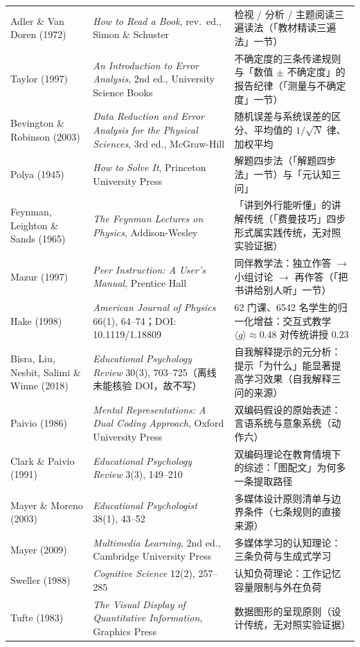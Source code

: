 {\begin{longtable}{@{}p{4.4cm}p{5.2cm}p{5.2cm}@{}}
Adler \& Van Doren (1972) & \textit{How to Read a Book}, rev.\ ed., Simon \& Schuster & 检视 / 分析 / 主题阅读三遍读法（「教材精读三遍法」一节） \\
Taylor (1997) & \textit{An Introduction to Error Analysis}, 2nd ed., University Science Books & 不确定度的三条传递规则与「数值 $\pm$ 不确定度」的报告纪律（「测量与不确定度」一节） \\
Bevington \& Robinson (2003) & \textit{Data Reduction and Error Analysis for the Physical Sciences}, 3rd ed., McGraw-Hill & 随机误差与系统误差的区分、平均值的 $1/\sqrt{N}$ 律、加权平均 \\
Polya (1945) & \textit{How to Solve It}, Princeton University Press & 解题四步法（「解题四步法」一节）与「元认知三问」 \\
Feynman, Leighton \& Sands (1965) & \textit{The Feynman Lectures on Physics}, Addison-Wesley & 「讲到外行能听懂」的讲解传统（「费曼技巧」四步形式属实践传统，无对照实验证据） \\
Mazur (1997) & \textit{Peer Instruction: A User's Manual}, Prentice Hall & 同伴教学法：独立作答 $\to$ 小组讨论 $\to$ 再作答（「把书讲给别人听」一节） \\
Hake (1998) & \textit{American Journal of Physics} 66(1), 64--74；DOI: 10.1119/1.18809 & 62 门课、6542 名学生的归一化增益：交互式教学 $\langle g\rangle\approx0.48$ 对传统讲授 $0.23$ \\
Bisra, Liu, Nesbit, Salimi \& Winne (2018) & \textit{Educational Psychology Review} 30(3), 703--725（离线未能核验 DOI，故不写） & 自我解释提示的元分析：提示「为什么」能显著提高学习效果（自我解释三问的来源） \\
Paivio (1986) & \textit{Mental Representations: A Dual Coding Approach}, Oxford University Press & 双编码假设的原始表述：言语系统与意象系统（动作六） \\
Clark \& Paivio (1991) & \textit{Educational Psychology Review} 3(3), 149--210 & 双编码理论在教育情境下的综述：「图配文」为何多一条提取路径 \\
Mayer \& Moreno (2003) & \textit{Educational Psychologist} 38(1), 43--52 & 多媒体设计原则清单与边界条件（七条规则的直接来源） \\
Mayer (2009) & \textit{Multimedia Learning}, 2nd ed., Cambridge University Press & 多媒体学习的认知理论：三条负荷与生成式学习 \\
Sweller (1988) & \textit{Cognitive Science} 12(2), 257--285 & 认知负荷理论：工作记忆容量限制与外在负荷 \\
Tufte (1983) & \textit{The Visual Display of Quantitative Information}, Graphics Press & 数据图形的呈现原则（设计传统，无对照实验证据） \\

\end{longtable}}
